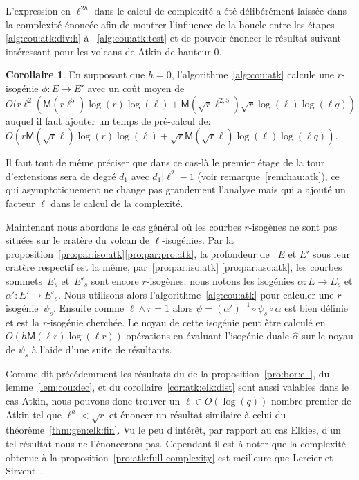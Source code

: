 \documentclass[10pt,a4paper]{book}
\theoremstyle{plain}
\theoremstyle{definition}
\theoremstyle{definition}
\theoremstyle{definition}
\newtheorem{cor}[thm]{Corollaire}
\theoremstyle{definition}
\theoremstyle{definition}
\theoremstyle{remark}
\theoremstyle{remark}
\theoremstyle{definition}
\begin{document}
L'expression en $\ell^{2h}$ dans le calcul de complexité a été délibérément 
laissée dans la complexité énoncée afin de montrer l'influence de la boucle 
entre les étapes \ref{alg:cou:atk:div:h} à ~\ref{alg:cou:atk:test} et de 
pouvoir énoncer le résultat suivant intéressant pour les volcans de 
Atkin de hauteur $0$.

\begin{cor}
  \label{cor:atk:full-complexity:h=0}
  En supposant que $h=0$, 
  l'algorithme~\ref{alg:cou:atk} calcule une $r$-isogénie 
  ${\phi:E \rightarrow E'}$ avec un coût moyen de \[
  O(r \ell^2 (\mathsf{M}(r\ell^5)\log(r)\log(\ell)+\mathsf{M}(\sqrt{r}\ell^{2,5})\sqrt{r}\log(\ell)\log(\ell q))\]
auquel il faut ajouter un temps de pré-calcul de:
$O(r \mathsf{M}(\sqrt{r}\ell)\log(r)\log(\ell)+ \sqrt{r} \mathsf{M}(\sqrt{r}\ell)\log(\ell)\log(\ell q))$.
\end{cor}

Il faut tout de même préciser que dans ce cas-là le premier étage de la tour 
d'extensions sera de degré $d_1$ avec $d_1 | \ell^2-1$ (voir 
remarque~\ref{rem:hau:atk}), ce qui asymptotiquement ne change pas grandement 
l'analyse mais qui a ajouté un facteur $\ell$ dans le calcul de la complexité.

Maintenant nous abordons le cas général où les courbes $r$-isogènes ne sont
pas situées sur le cratère du volcan de $\ell$-isogénies.
Par la proposition~\ref{pro:par:iso:atk}\eqref{pro:par:pro:atk}, la profondeur 
de ~$E$ et $E'$ sous leur cratère respectif est la même, 
par~\ref{pro:par:iso:atk} \eqref{pro:par:asc:atk}, les
courbes sommets~$E_{s}$ et~$E'_{s}$ sont encore $r$-isogènes; nous notons 
les isogénies $\alpha:E \rightarrow E_{s}$ et $\alpha':E' \rightarrow E'_{s}$. 
Nous utilisons alors l'algorithme~\ref{alg:cou:atk} pour calculer une 
$r$-isogénie~$\psi_{s}$. Ensuite comme $\ell \wedge r =1$ alors $\psi = 
(\alpha ')^{-1} \circ \psi_{s} \circ \alpha$ est bien définie et est la $r$-isogénie
cherchée. Le noyau de cette isogénie peut être calculé en $O(h\mathsf{M}(\ell r)\log(\ell r))$
opérations en évaluant l'isogénie duale $\widehat{\alpha}$ sur le noyau de 
$\psi_s$ à l'aide d'une suite de résultants. %

Comme dit précédemment les résultats du de la proposition~\ref{pro:bor:ell}, du
lemme~\ref{lem:cou:dec}, et du corollaire~\ref{cor:atk:elk:dist} sont 
aussi valables dans le cas Atkin, nous pouvons donc trouver un $\ell \in O(\log(q))$
nombre premier de Atkin tel que $\ell^h<\sqrt{r}$ et énoncer un résultat 
similaire à celui du théorème~\ref{thm:gen:elk:fin}. Vu le peu d'intérêt, par 
rapport au cas Elkies, d'un tel résultat nous ne l'énoncerons pas. Cependant il
est à noter que la complexité obtenue à la 
proposition~\ref{pro:atk:full-complexity} est meilleure que Lercier et 
Sirvent~\cite{Lercier-Sirvent2008}.
\end{document}
